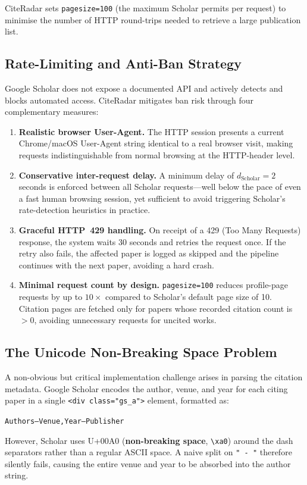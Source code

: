 \documentclass[11pt]{article}
\begin{document}
CiteRadar sets \texttt{pagesize=100} (the maximum Scholar permits per request)
to minimise the number of HTTP round-trips needed to retrieve a large
publication list.

\subsection{Rate-Limiting and Anti-Ban Strategy}

Google Scholar does not expose a documented API and actively detects and
blocks automated access.
CiteRadar mitigates ban risk through four complementary measures:

\begin{enumerate}[label=\arabic*., leftmargin=*]
\item \textbf{Realistic browser User-Agent.}
  The HTTP session presents a current Chrome/macOS User-Agent string
  identical to a real browser visit, making requests indistinguishable
  from normal browsing at the HTTP-header level.

\item \textbf{Conservative inter-request delay.}
  A minimum delay of $d_{\mathrm{Scholar}} = 2$ seconds is enforced between
  all Scholar requests—well below the pace of even a fast human browsing
  session, yet sufficient to avoid triggering Scholar's rate-detection
  heuristics in practice.

\item \textbf{Graceful HTTP~429 handling.}
  On receipt of a 429 (Too Many Requests) response, the system waits
  30 seconds and retries the request once.
  If the retry also fails, the affected paper is logged as skipped and the
  pipeline continues with the next paper, avoiding a hard crash.

\item \textbf{Minimal request count by design.}
  \texttt{pagesize=100} reduces profile-page requests by up to $10\times$
  compared to Scholar's default page size of 10.
  Citation pages are fetched only for papers whose recorded citation count
  is $> 0$, avoiding unnecessary requests for uncited works.
\end{enumerate}

\subsection{The Unicode Non-Breaking Space Problem}

A non-obvious but critical implementation challenge arises in parsing the
citation metadata.
Google Scholar encodes the author, venue, and year for each citing paper
in a single \texttt{<div class="gs\_a">} element, formatted as:
\begin{center}
\texttt{Authors\;--\;Venue,\;Year\;--\;Publisher}
\end{center}
However, Scholar uses U+00A0 (\textbf{non-breaking space}, \texttt{\textbackslash xa0})
around the dash separators rather than a regular ASCII space.
A naive split on \texttt{" - "} therefore silently fails, causing the
entire venue and year to be absorbed into the author string.
\end{document}
